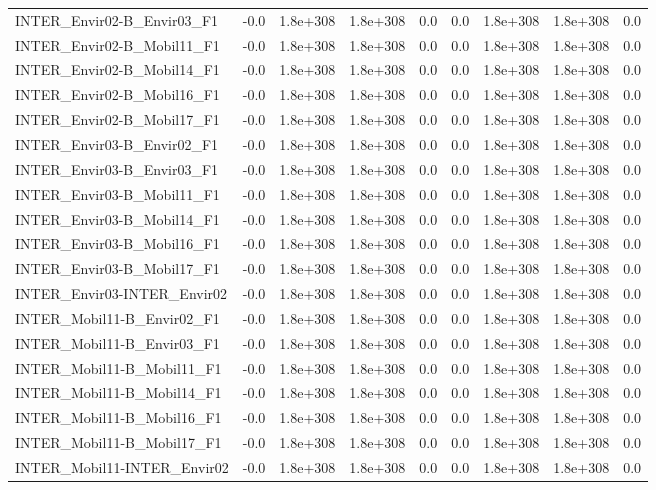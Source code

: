 \begin{tabular}{lrrrrrrrr}
INTER_Envir02-B_Envir03_F1 & -0.0 & 1.8e+308 & 1.8e+308 & 0.0 & 0.0 & 1.8e+308 & 1.8e+308 & 0.0 \\
INTER_Envir02-B_Mobil11_F1 & -0.0 & 1.8e+308 & 1.8e+308 & 0.0 & 0.0 & 1.8e+308 & 1.8e+308 & 0.0 \\
INTER_Envir02-B_Mobil14_F1 & -0.0 & 1.8e+308 & 1.8e+308 & 0.0 & 0.0 & 1.8e+308 & 1.8e+308 & 0.0 \\
INTER_Envir02-B_Mobil16_F1 & -0.0 & 1.8e+308 & 1.8e+308 & 0.0 & 0.0 & 1.8e+308 & 1.8e+308 & 0.0 \\
INTER_Envir02-B_Mobil17_F1 & -0.0 & 1.8e+308 & 1.8e+308 & 0.0 & 0.0 & 1.8e+308 & 1.8e+308 & 0.0 \\
INTER_Envir03-B_Envir02_F1 & -0.0 & 1.8e+308 & 1.8e+308 & 0.0 & 0.0 & 1.8e+308 & 1.8e+308 & 0.0 \\
INTER_Envir03-B_Envir03_F1 & -0.0 & 1.8e+308 & 1.8e+308 & 0.0 & 0.0 & 1.8e+308 & 1.8e+308 & 0.0 \\
INTER_Envir03-B_Mobil11_F1 & -0.0 & 1.8e+308 & 1.8e+308 & 0.0 & 0.0 & 1.8e+308 & 1.8e+308 & 0.0 \\
INTER_Envir03-B_Mobil14_F1 & -0.0 & 1.8e+308 & 1.8e+308 & 0.0 & 0.0 & 1.8e+308 & 1.8e+308 & 0.0 \\
INTER_Envir03-B_Mobil16_F1 & -0.0 & 1.8e+308 & 1.8e+308 & 0.0 & 0.0 & 1.8e+308 & 1.8e+308 & 0.0 \\
INTER_Envir03-B_Mobil17_F1 & -0.0 & 1.8e+308 & 1.8e+308 & 0.0 & 0.0 & 1.8e+308 & 1.8e+308 & 0.0 \\
INTER_Envir03-INTER_Envir02 & -0.0 & 1.8e+308 & 1.8e+308 & 0.0 & 0.0 & 1.8e+308 & 1.8e+308 & 0.0 \\
INTER_Mobil11-B_Envir02_F1 & -0.0 & 1.8e+308 & 1.8e+308 & 0.0 & 0.0 & 1.8e+308 & 1.8e+308 & 0.0 \\
INTER_Mobil11-B_Envir03_F1 & -0.0 & 1.8e+308 & 1.8e+308 & 0.0 & 0.0 & 1.8e+308 & 1.8e+308 & 0.0 \\
INTER_Mobil11-B_Mobil11_F1 & -0.0 & 1.8e+308 & 1.8e+308 & 0.0 & 0.0 & 1.8e+308 & 1.8e+308 & 0.0 \\
INTER_Mobil11-B_Mobil14_F1 & -0.0 & 1.8e+308 & 1.8e+308 & 0.0 & 0.0 & 1.8e+308 & 1.8e+308 & 0.0 \\
INTER_Mobil11-B_Mobil16_F1 & -0.0 & 1.8e+308 & 1.8e+308 & 0.0 & 0.0 & 1.8e+308 & 1.8e+308 & 0.0 \\
INTER_Mobil11-B_Mobil17_F1 & -0.0 & 1.8e+308 & 1.8e+308 & 0.0 & 0.0 & 1.8e+308 & 1.8e+308 & 0.0 \\
INTER_Mobil11-INTER_Envir02 & -0.0 & 1.8e+308 & 1.8e+308 & 0.0 & 0.0 & 1.8e+308 & 1.8e+308 & 0.0 \\

\end{tabular}
